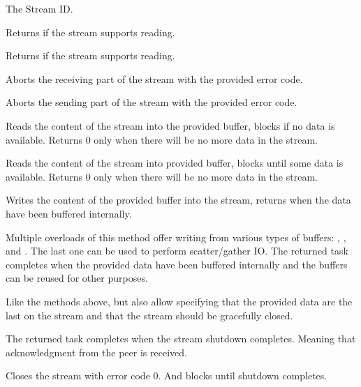 \begin{description}

     The Stream ID\@.

     Returns  if the stream supports
reading.

     Returns  if the stream supports
reading.

     Aborts the receiving part of the stream with the
provided error code.

     Aborts the sending part of the stream with the
provided error code.

     Reads the content of the stream into the
provided buffer, blocks if no data is available. Returns 0 only when there will be no more data in
the stream.

Reads the content of the stream into provided buffer, blocks until some data is available. Returns 0
only when there will be no more data in the stream.

     Writes the content of the provided buffer
into the stream, returns when the data have been buffered internally.

Multiple overloads of this method offer writing from various types of buffers:
\ReadOnlyMemoryOf{\Byte{}}, \ReadOnlySequenceOf{\Byte{}}, and
. The last one can be used to
perform scatter/gather IO. The returned task completes when the provided data have been buffered
internally and the buffers can be reused for other purposes.

     Like the methods above, but also allow specifying that the provided data are the last on
the stream and that the stream should be gracefully closed.

     The returned task
completes when the stream shutdown completes. Meaning that acknowledgment from the peer is received.

     Closes the stream with error code 0. And blocks until
shutdown completes.

\end{description}

